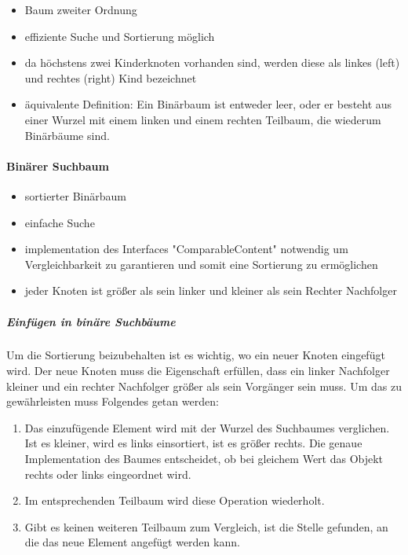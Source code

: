 \documentclass{article}
\begin{document}
	\begin{itemize}
		\item Baum zweiter Ordnung
		\item effiziente Suche und Sortierung möglich
		\item da höchstens zwei Kinderknoten vorhanden sind, werden diese als linkes (left) und rechtes (right) Kind bezeichnet
		\item äquivalente Definition: Ein Binärbaum ist entweder leer, oder er besteht aus einer Wurzel mit einem linken und einem rechten Teilbaum, die wiederum Binärbäume sind. 
	\end{itemize}
	
	\paragraph{Binärer Suchbaum}
	
	\begin{itemize}
		\item sortierter Binärbaum
		\item einfache Suche
		\item implementation des Interfaces "ComparableContent" notwendig um Vergleichbarkeit zu garantieren und somit eine Sortierung zu ermöglichen
		\item jeder Knoten ist größer als sein linker und kleiner als sein Rechter Nachfolger
	\end{itemize}
	
	\subparagraph{Einfügen in binäre Suchbäume}
	
	Um die Sortierung beizubehalten ist es wichtig, wo ein neuer Knoten eingefügt wird. Der neue Knoten muss die Eigenschaft erfüllen, dass ein linker Nachfolger kleiner und ein rechter Nachfolger größer als sein Vorgänger sein muss. Um das zu gewährleisten muss Folgendes getan werden: 
	
	\begin{enumerate}
		\item Das einzufügende Element wird mit der Wurzel des Suchbaumes verglichen. Ist es kleiner, wird es links einsortiert, ist es größer rechts. Die genaue Implementation des Baumes entscheidet, ob bei gleichem Wert das Objekt rechts oder links eingeordnet wird.
		\item Im entsprechenden Teilbaum wird diese Operation wiederholt. 
		\item Gibt es keinen weiteren Teilbaum zum Vergleich, ist die Stelle gefunden, an die das neue Element angefügt werden kann.
	\end{enumerate}
	
\end{document}
